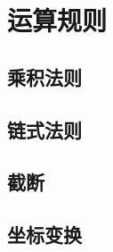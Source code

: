 \section{运算规则}
\label{b1:sec:2103}


\subsection{乘积法则}
\label{b1:subsec:210301}

\subsection{链式法则}
\label{b1:subsec:210302}

\subsection{截断}
\label{b1:subsec:210303}

\subsection{坐标变换}
\label{b1:subsec:210304}


